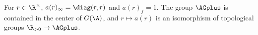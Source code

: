For $r\in\R^\times$, $a(r)_\infty=\diag(r,r)$ and $a(r)_f=1$. The group $\AGplus$ is contained in the center of $G(\A)$, and $r\mapsto a(r)$ is an isomorphism of topological groups $\R_{>0}\to\AGplus$.
